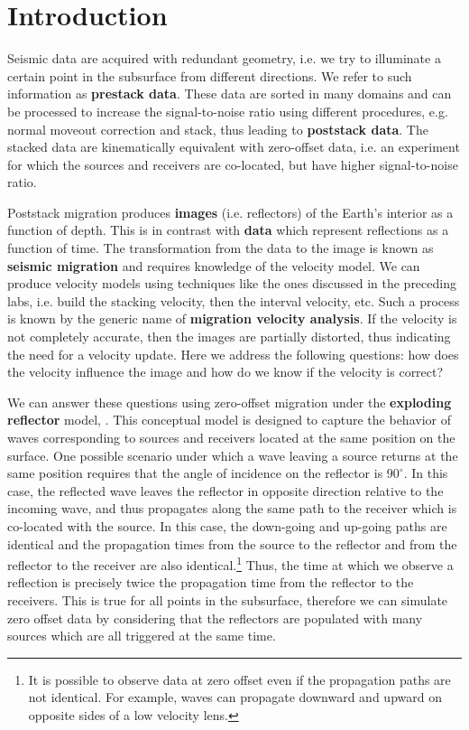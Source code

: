 \section{Introduction}

Seismic data are acquired with redundant geometry, i.e. we try to
illuminate a certain point in the subsurface from different
directions. We refer to such information as \textbf{prestack
  data}. These data are sorted in many domains and can be processed to
increase the signal-to-noise ratio using different procedures,
e.g. normal moveout correction and stack, thus leading to
\textbf{poststack data}. The stacked data are kinematically equivalent
with zero-offset data, i.e. an experiment for which the sources and
receivers are co-located, but have higher signal-to-noise ratio.

Poststack migration produces \textbf{images} (i.e. reflectors) of the
Earth's interior as a function of depth. This is in contrast with
\textbf{data} which represent reflections as a function of time. 
%
The transformation from the data to the image is known as
\textbf{seismic migration} and requires knowledge of the velocity
model. We can produce velocity models using techniques like the ones
discussed in the preceding labs, i.e. build the stacking velocity,
then the interval velocity, etc. Such a process is known by the
generic name of \textbf{migration velocity analysis}. If the velocity
is not completely accurate, then the images are partially distorted,
thus indicating the need for a velocity update. Here we address the
following questions: how does the velocity influence the image and how
do we know if the velocity is correct?

We can answer these questions using zero-offset migration under the
\textbf{exploding reflector} model, . This conceptual
model is designed to capture the behavior of waves corresponding to
sources and receivers located at the same position on the surface. One
possible scenario under which a wave leaving a source returns at the
same position requires that the angle of incidence on the reflector is
$90^\circ$. In this case, the reflected wave leaves the reflector in
opposite direction relative to the incoming wave, and thus propagates
along the same path to the receiver which is co-located with the
source. In this case, the down-going and up-going paths are identical
and the propagation times from the source to the reflector and from
the reflector to the receiver are also identical.\footnote{It is
  possible to observe data at zero offset even if the propagation
  paths are not identical. For example, waves can propagate downward
  and upward on opposite sides of a low velocity lens.} Thus, the time
at which we observe a reflection is precisely twice the propagation
time from the reflector to the receivers. This is true for all points
in the subsurface, therefore we can simulate zero offset data by
considering that the reflectors are populated with many sources which
are all triggered at the same time.

